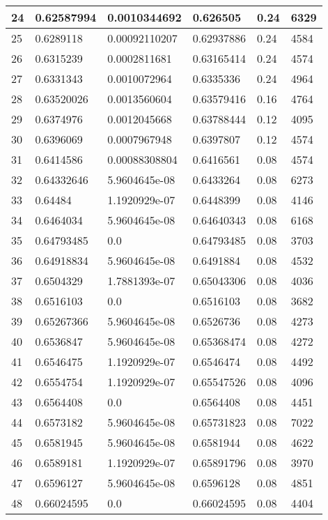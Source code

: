 \begin{longtable}{|l|l|l|l|l|l|}
24 & 0.62587994 & 0.0010344692 & 0.626505 & 0.24 & 6329 \\ \hline 
25 & 0.6289118 & 0.00092110207 & 0.62937886 & 0.24 & 4584 \\ \hline 
26 & 0.6315239 & 0.0002811681 & 0.63165414 & 0.24 & 4574 \\ \hline 
27 & 0.6331343 & 0.0010072964 & 0.6335336 & 0.24 & 4964 \\ \hline 
28 & 0.63520026 & 0.0013560604 & 0.63579416 & 0.16 & 4764 \\ \hline 
29 & 0.6374976 & 0.0012045668 & 0.63788444 & 0.12 & 4095 \\ \hline 
30 & 0.6396069 & 0.0007967948 & 0.6397807 & 0.12 & 4574 \\ \hline 
31 & 0.6414586 & 0.00088308804 & 0.6416561 & 0.08 & 4574 \\ \hline 
32 & 0.64332646 & 5.9604645e-08 & 0.6433264 & 0.08 & 6273 \\ \hline 
33 & 0.64484 & 1.1920929e-07 & 0.6448399 & 0.08 & 4146 \\ \hline 
34 & 0.6464034 & 5.9604645e-08 & 0.64640343 & 0.08 & 6168 \\ \hline 
35 & 0.64793485 & 0.0 & 0.64793485 & 0.08 & 3703 \\ \hline 
36 & 0.64918834 & 5.9604645e-08 & 0.6491884 & 0.08 & 4532 \\ \hline 
37 & 0.6504329 & 1.7881393e-07 & 0.65043306 & 0.08 & 4036 \\ \hline 
38 & 0.6516103 & 0.0 & 0.6516103 & 0.08 & 3682 \\ \hline 
39 & 0.65267366 & 5.9604645e-08 & 0.6526736 & 0.08 & 4273 \\ \hline 
40 & 0.6536847 & 5.9604645e-08 & 0.65368474 & 0.08 & 4272 \\ \hline 
41 & 0.6546475 & 1.1920929e-07 & 0.6546474 & 0.08 & 4492 \\ \hline 
42 & 0.6554754 & 1.1920929e-07 & 0.65547526 & 0.08 & 4096 \\ \hline 
43 & 0.6564408 & 0.0 & 0.6564408 & 0.08 & 4451 \\ \hline 
44 & 0.6573182 & 5.9604645e-08 & 0.65731823 & 0.08 & 7022 \\ \hline 
45 & 0.6581945 & 5.9604645e-08 & 0.6581944 & 0.08 & 4622 \\ \hline 
46 & 0.6589181 & 1.1920929e-07 & 0.65891796 & 0.08 & 3970 \\ \hline 
47 & 0.6596127 & 5.9604645e-08 & 0.6596128 & 0.08 & 4851 \\ \hline 
48 & 0.66024595 & 0.0 & 0.66024595 & 0.08 & 4404 \\ \hline 

\end{longtable}
